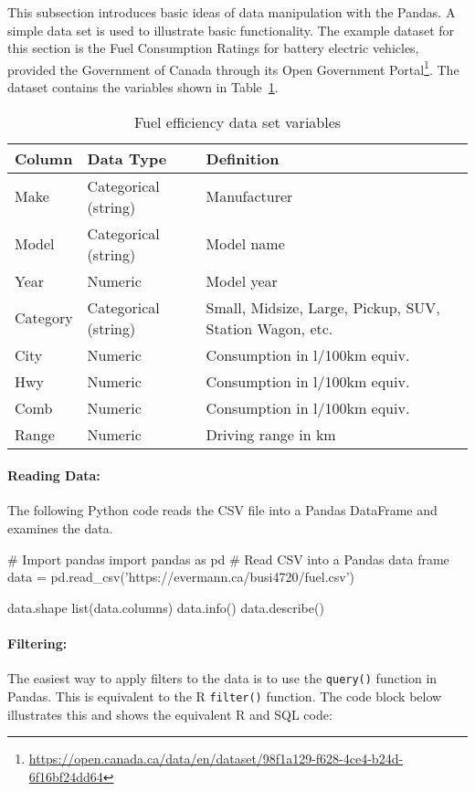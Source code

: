 This subsection introduces basic ideas of data manipulation with the Pandas. A simple data set is used to illustrate basic functionality. The example dataset for this section is the Fuel Consumption Ratings for battery electric vehicles, provided the Government of Canada through its Open Government Portal\footnote{\scriptsize\url{https://open.canada.ca/data/en/dataset/98f1a129-f628-4ce4-b24d-6f16bf24dd64}}. The dataset contains the variables shown in Table~\ref{tab:fueldatachapter6}.

\begin{table}[h]
\centering
\renewcommand{\arraystretch}{1.25}

\begin{tabularx}{.9\linewidth}{|l|l|X|} \hline
  {\bf Column} & {\bf Data Type} & {\bf Definition} \\ \hline \hline
  Make & Categorical (string) & Manufacturer \\ 
  Model & Categorical (string) & Model name\\
  Year & Numeric & Model year \\
  Category & Categorical (string) & Small, Midsize, Large, Pickup, SUV, Station Wagon, etc. \\
  City & Numeric & Consumption in l/100km equiv. \\
  Hwy & Numeric & Consumption in l/100km equiv. \\
  Comb & Numeric & Consumption in l/100km equiv. \\
  Range & Numeric & Driving range in km \\ \hline
\end{tabularx}
\caption{Fuel efficiency data set variables}
\label{tab:fueldatachapter6}
\end{table}

\paragraph*{Reading Data:} The following Python code reads the CSV file into a Pandas DataFrame and examines the data.

\begin{pythoncode}
# Import pandas 
import pandas as pd
# Read CSV into a Pandas data frame
data = pd.read_csv('https://evermann.ca/busi4720/fuel.csv')

data.shape
list(data.columns)
data.info()
data.describe()
\end{pythoncode}

\paragraph*{Filtering:} The easiest way to apply filters to the data is to use the \texttt{query()} function in Pandas. This is equivalent to the R \texttt{filter()} function. The code block below illustrates this and shows the equivalent R and SQL code:

